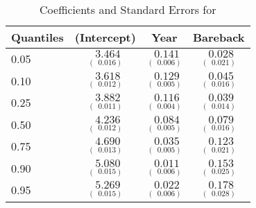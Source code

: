 \documentclass[11pt]{article}
\begin{document}
\begin{table}[hptb]
\caption{Coefficients and Standard Errors for }
\begin{center}
\begin{tabular}{|l||c|c|c|} \hline
\multicolumn{1}{|l||}{Quantiles}&\multicolumn{1}{c|}{(Intercept)}&\multicolumn{1}{c|}{Year}&\multicolumn{1}{c|}{Bareback}\\ \hline
0.05&$\underset{(~~0.016)}{~~3.464}$&$\underset{(~~0.006)}{~~0.141}$&$\underset{(~~0.021)}{~~0.028}$\\ 
0.10&$\underset{(~~0.012)}{~~3.618}$&$\underset{(~~0.005)}{~~0.129}$&$\underset{(~~0.016)}{~~0.045}$\\ 
0.25&$\underset{(~~0.011)}{~~3.882}$&$\underset{(~~0.004)}{~~0.116}$&$\underset{(~~0.014)}{~~0.039}$\\ 
0.50&$\underset{(~~0.012)}{~~4.236}$&$\underset{(~~0.005)}{~~0.084}$&$\underset{(~~0.016)}{~~0.079}$\\ 
0.75&$\underset{(~~0.013)}{~~4.690}$&$\underset{(~~0.005)}{~~0.035}$&$\underset{(~~0.021)}{~~0.123}$\\ 
0.90&$\underset{(~~0.015)}{~~5.080}$&$\underset{(~~0.006)}{~~0.011}$&$\underset{(~~0.025)}{~~0.153}$\\ 
0.95&$\underset{(~~0.015)}{~~5.269}$&$\underset{(~~0.006)}{~~0.022}$&$\underset{(~~0.028)}{~~0.178}$\\ 
\hline
\end{tabular}
\vspace{3mm}
\end{center}
\end{table}
\end{document}
